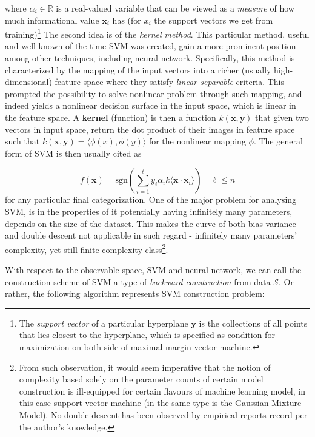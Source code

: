 where $\alpha_{i}\in \mathbb{R}$ is a real-valued variable that can be viewed as a \textit{measure} of how much informational value $\mathbf{x}_{i}$ has (for $x_{i}$ the support vectors we get from training)\footnote{The \textit{support vector} of a particular hyperplane $\mathbf{y}$ is the collections of all points that lies closest to the hyperplane, which is specified as condition for maximization on both side of maximal margin vector machine.} The second idea is of the \textit{kernel method}. This particular method, useful and well-known of the time SVM was created, gain a more prominent position among other techniques, including neural network. Specifically, this method is characterized by the mapping of the input vectors into a richer (usually high-dimensional) feature space where they satisfy \textit{linear separable} criteria. This prompted the possibility to solve nonlinear problem through such mapping, and indeed yields a nonlinear decision surface in the input space, which is linear in the feature space. A \textbf{kernel} (function) is then a function $k(\mathbf{x},\mathbf{y})$ that given two vectors in input space, return the dot product of their images in feature space such that $k(\mathbf{x},\mathbf{y})=\langle \phi(x), \phi(y) \rangle$ for the nonlinear mapping $\phi$. The general form of SVM is then usually cited as 

\begin{equation}
    f(\mathbf{x}) = \mathrm{sgn} \left(\sum^{\ell}_{i=1} y_{i}\alpha_{i}k\langle \mathbf{x}\cdot \mathbf{x}_{i} \rangle\right)\quad \ell \leq n
\end{equation}
for any particular final categorization. One of the major problem for analysing SVM, is in the properties of it potentially having infinitely many parameters, depends on the size of the dataset. This makes the curve of both bias-variance and double descent not applicable in such regard - infinitely many parameters' complexity, yet still finite complexity class\footnote{From such observation, it would seem imperative that the notion of complexity based solely on the parameter counts of certain model construction is ill-equipped for certain flavours of machine learning model, in this case support vector machine (in the same type is the Gaussian Mixture Model). No double descent has been observed by empirical reports record per the author's knowledge.}. 

With respect to the observable space, SVM and neural network, we can call the construction scheme of SVM a type of \textit{backward construction} from data $\mathcal{S}$. Or rather, the following algorithm represents SVM construction problem: 

